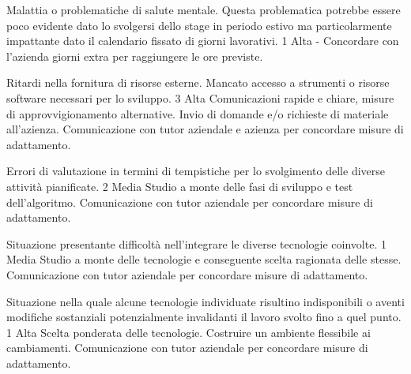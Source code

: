 {Malattia o problematiche di salute mentale. Questa problematica potrebbe essere poco evidente dato lo svolgersi dello stage in periodo estivo ma particolarmente impattante dato il calendario fissato di giorni lavorativi.}
{1}
{Alta}
{-}
{Concordare con l'azienda giorni extra per raggiungere le ore previste.}

{Ritardi nella fornitura di risorse esterne. Mancato accesso a strumenti o risorse software necessari per lo sviluppo.}
{3}
{Alta}
{Comunicazioni rapide e chiare, misure di approvvigionamento alternative. Invio di domande e/o richieste di materiale all'azienza.}
{Comunicazione con tutor aziendale e azienza per concordare misure di adattamento.}

{Errori di valutazione in termini di tempistiche per lo svolgimento delle diverse attività pianificate.}
{2}
{Media}
{Studio a monte delle fasi di sviluppo e test dell'algoritmo.}
{Comunicazione con tutor aziendale per concordare misure di adattamento.}

{Situazione presentante difficoltà nell’integrare le diverse tecnologie coinvolte.}
{1}
{Media}
{Studio a monte delle tecnologie e conseguente scelta ragionata delle stesse.}
{Comunicazione con tutor aziendale per concordare misure di adattamento.}

{Situazione nella quale alcune tecnologie individuate risultino indisponibili o aventi modifiche sostanziali potenzialmente invalidanti il lavoro svolto fino a quel punto.}
{1}
{Alta}
{Scelta ponderata delle tecnologie. Costruire un ambiente flessibile ai cambiamenti.}
{Comunicazione con tutor aziendale per concordare misure di adattamento.}
